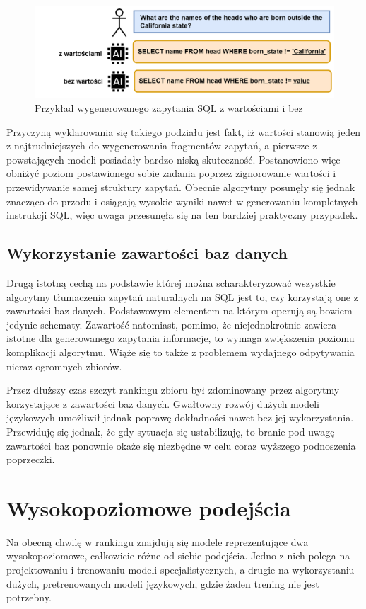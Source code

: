 \begin{figure}[ht!]
  \centering
  \includegraphics[width=1.0\linewidth]{images/query_values.png}
  \caption{Przykład wygenerowanego zapytania SQL z wartościami i bez}
  \label{fig:query-values}
\end{figure}

Przyczyną wyklarowania się takiego podziału jest fakt, iż wartości stanowią jeden z najtrudniejszych do wygenerowania fragmentów zapytań, a pierwsze z powstających modeli posiadały bardzo niską skuteczność. Postanowiono więc obniżyć poziom postawionego sobie zadania poprzez zignorowanie wartości i przewidywanie samej struktury zapytań. Obecnie algorytmy posunęły się jednak znacząco do przodu i osiągają wysokie wyniki nawet w generowaniu kompletnych instrukcji SQL, więc uwaga przesunęła się na ten bardziej praktyczny przypadek.

\subsection{Wykorzystanie zawartości baz danych}
Drugą istotną cechą na podstawie której można scharakteryzować wszystkie algorytmy tłumaczenia zapytań naturalnych na SQL jest to, czy korzystają one z zawartości baz danych. Podstawowym elementem na którym operują są bowiem jedynie schematy. Zawartość natomiast, pomimo, że niejednokrotnie zawiera istotne dla generowanego zapytania informacje, to wymaga zwiększenia poziomu komplikacji algorytmu. Wiąże się to także z problemem wydajnego odpytywania nieraz ogromnych zbiorów. 

Przez dłuższy czas szczyt rankingu zbioru  był zdominowany przez algorytmy korzystające z zawartości baz danych. Gwałtowny rozwój dużych modeli językowych umożliwił jednak poprawę dokładności nawet bez jej wykorzystania. Przewiduję się jednak, że gdy sytuacja się ustabilizuję, to branie pod uwagę zawartości baz ponownie okaże się niezbędne w celu coraz wyższego podnoszenia poprzeczki.

\section{Wysokopoziomowe podejścia}
Na obecną chwilę w rankingu  znajdują się modele reprezentujące dwa wysokopoziomowe, całkowicie różne od siebie podejścia. Jedno z nich polega na projektowaniu i trenowaniu modeli specjalistycznych, a drugie na wykorzystaniu dużych, pretrenowanych modeli językowych, gdzie żaden trening nie jest potrzebny. 

